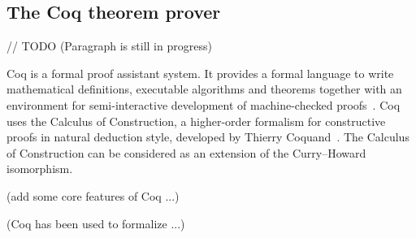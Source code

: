 \documentclass[article]{aaltoseries}
\begin{document}



\subsection{The Coq theorem prover}
\label{sec:prover_coq}

// TODO (Paragraph is still in progress)

Coq is a formal proof assistant system. It provides a formal language to write mathematical definitions, executable algorithms and theorems together with an environment for semi-interactive development of machine-checked proofs~\cite{tool_Coq}. Coq uses the Calculus of Construction, a higher-order formalism for constructive proofs in natural deduction style, developed by Thierry Coquand~\cite{Coq86}. 
The Calculus of Construction can be considered as an extension of the Curry–Howard isomorphism. %

(add some core features of Coq ...)

(Coq has been used to formalize ...)

\end{document}

